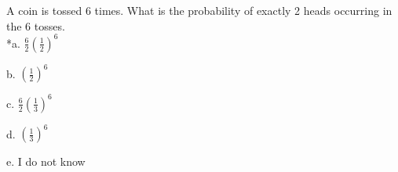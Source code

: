 
A coin is tossed 6 times. What is the probability of exactly 2 heads
occurring in the 6 tosses. \\

*a. \(\frac{6}{2}(\frac{1}{2})^{6}\)

b. \((\frac{1}{2})^{6}\)

c. \(\frac{6}{2}(\frac{1}{3})^{6}\)

d. \((\frac{1}{3})^{6}\)

e. I do not know \\
